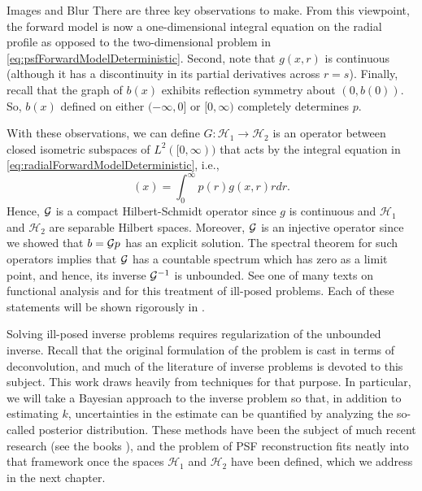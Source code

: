 \begin{chapter}{Images and Blur}
  There are three key observations to make.
  From this viewpoint, the forward model is now a one-dimensional integral equation on the radial profile as opposed to the two-dimensional problem in \eqref{eq:psfForwardModelDeterministic}.
  Second, note that $g(x,r)$ is continuous (although it has a discontinuity in its partial derivatives across $r=s$).
  Finally, recall that the graph of $b(x)$ exhibits reflection symmetry about $(0,b(0))$.
  So, $b(x)$ defined on either $(-\infty,0]$ or $[0,\infty)$ completely determines $p$.

  With these observations, we can define $G: \mathcal H_1 \to \mathcal H_2$ is an operator between closed isometric subspaces of $L^2([0,\infty))$ that acts by the integral equation in \eqref{eq:radialForwardModelDeterministic}, i.e., 
  \begin{equation}
    [\G p](x) = \int_0^\infty p(r) g(x,r) r dr.
  \end{equation}
  Hence, $\mathcal G$ is a compact Hilbert-Schmidt operator since $g$ is continuous and $\mathcal H_1$ and $\mathcal H_2$ are separable Hilbert spaces.
  Moreover, $\mathcal G$ is an injective operator since we showed that $b = \mathcal G p$ has an explicit solution. 
  The spectral theorem for such operators implies that $\mathcal G$ has a countable spectrum which has zero as a limit point, and hence, its inverse $\mathcal G^{-1}$ is unbounded. %
  See one of many texts on functional analysis \citep{bachman1966,rudin1991} and \citep{tikhonov1963,vogel2002,morozov1993} for this treatment of ill-posed problems.
  Each of these statements will be shown rigorously in .

  Solving ill-posed inverse problems requires regularization of the unbounded inverse.
  Recall that the original formulation of the problem is cast in terms of deconvolution, and much of the literature of inverse problems is devoted to this subject.
  This work draws heavily from techniques for that purpose. 
  In particular, we will take a Bayesian approach to the inverse problem so that, in addition to estimating $k$, uncertainties in the estimate can be quantified by analyzing the so-called posterior distribution.
  These methods have been the subject of much recent research (see the books \citep{calvetti2007introduction,kaipo2005,stuart2010}), and the problem of PSF reconstruction fits neatly into that framework once the spaces $\mathcal H_1$ and $\mathcal H_2$ have been defined, which we address in the next chapter.

\end{chapter}
